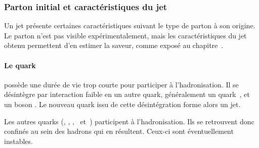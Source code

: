 \subsubsection{Parton initial et caractéristiques du jet}
Un jet présente certaines caractéristiques suivant le type de parton à son origine.
Le parton n'est pas visible expérimentalement, mais les caractéristiques du jet obtenu permettent d'en estimer la saveur, comme exposé au chapitre~.
\paragraph{Le quark~\quarkt} possède une durée de vie trop courte pour participer à l'hadronisation.
Il se désintègre par interaction faible en un autre quark, généralement un quark~\quarkb, et un boson \Wboson.
Le nouveau quark issu de cette désintégration forme alors un jet.
\par Les autres quarks (\quarkd, \quarku, \quarks, \quarkc\ et~\quarkb) participent à l'hadronisation.
Ils se retrouvent donc confinés au sein des hadrons qui en résultent.
Ceux-ci sont éventuellement instables.

